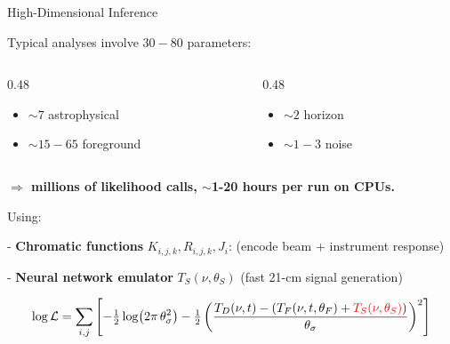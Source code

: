 \documentclass{beamer}
\begin{document}
\begin{frame}{High-Dimensional Inference}
\vspace{-0.6em}
\footnotesize
\begin{block}{Typical analyses involve $30\!-\!80$ parameters:}
\vspace{-0.4em}
\begin{columns}[T]

\begin{column}{0.48\textwidth}
\begin{itemize}
    \item $\sim 7$ astrophysical 
    \item $\sim 15\!-\!65$ foreground 
\end{itemize}
\end{column}

\begin{column}{0.48\textwidth}
\begin{itemize}
    \item $\sim 2$ horizon 
    \item $\sim 1\!-\!3$ noise 
\end{itemize}
\end{column}

\end{columns}
\end{block}

\textbf{$\Rightarrow$ millions of likelihood calls, $\sim$1-20 hours per run on CPUs.}

\pause

\vspace{0.5em}

\hrulefill

\vspace{0.5em}

\footnotesize
Using:

- {\color{red}\textbf{Chromatic functions} $K_{i,j,k}, R_{i,j,k}, J_i$}: (encode beam + instrument response)

- {\color{red}\textbf{Neural network emulator} $T_S(\nu,\theta_S)$} (fast 21-cm signal generation)

\tiny
\vspace{-0.6em}

\[
\log \mathcal{L}
=
\sum_{i,j}
\left[
-\tfrac{1}{2}\log\!\left(2\pi\,\theta_\sigma^2\right)
-
\tfrac{1}{2}
\left(
\frac{
T_D(\nu,t)
-
\left( T_F(\nu,t,\theta_F) 
      + {\color{red}T_S(\nu,\theta_S)}
\right)
}{
\theta_\sigma
}
\right)^2
\right]
\]


\end{frame}
\end{document}
